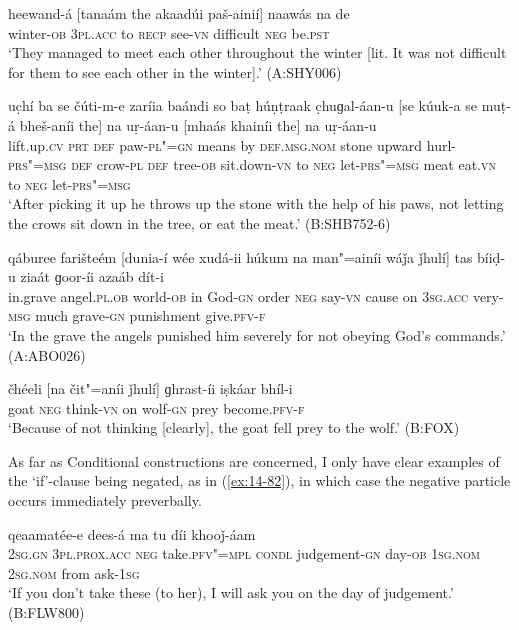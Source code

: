 \begin{exe}
\ex
\label{ex:14-78}
\gll heewand-á [tanaám the akaadúi paš-ainií] naawás  na de \\
winter-\textsc{ob} \textsc{3pl.acc} to \textsc{recp} see-\textsc{vn} difficult \textsc{neg}
be.\textsc{pst} \\
\glt `They managed to meet each other throughout the winter [lit. It was not difficult for them to see each other in the winter].' (A:SHY006)

\ex
\label{ex:14-79}
\gll uc̣hí ba se čúti-m-e zaríia baándi  so baṭ húṇṭraak c̣huɡal-áan-u  [se kúuk-a se muṭ-á bheš-aníi the] na uṛ-áan-u \textsc{[}mhaás khainíi the] na uṛ-áan-u \\
lift.up.\textsc{cv} \textsc{prt} \textsc{def} paw-\textsc{pl"=gn} means by  \textsc{def.msg.nom} stone upward hurl-\textsc{prs"=msg}  \textsc{def} crow-\textsc{pl} \textsc{def} tree-\textsc{ob} sit.down-\textsc{vn} to \textsc{neg} let-\textsc{prs"=msg} meat eat.\textsc{vn} to \textsc{neg} let-\textsc{prs"=msg} \\
\glt `After picking it up he throws up the stone with the help of his paws, not letting the crows sit down in the tree, or eat the meat.' (B:SHB752-6)

\ex
\label{ex:14-80}
\gll qáburee farišteém [dunia-í wée xudá-ii húkum na  man"=ainíi wáǰa
  ǰhulí] tas bíiḍ-u ziaát  ɡoor-íi azaáb dít-i \\
in.grave angel.\textsc{pl.ob} world-\textsc{ob} in God-\textsc{gn} order \textsc{neg}  say-\textsc{vn} cause on \textsc{3sg.acc} very-\textsc{msg} much grave-\textsc{gn} punishment give.\textsc{pfv-f}  \\
\glt `In the grave the angels punished him severely for not obeying God's commands.' (A:ABO026)

\ex
\label{ex:14-81}
\gll čhéeli [na čit"=aníi ǰhulí] ɡhrast-íi iṣkáar bhíl-i \\
goat \textsc{neg} think-\textsc{vn} on wolf-\textsc{gn} prey become.\textsc{pfv-f} \\
\glt `Because of not thinking [clearly], the goat fell prey to the wolf.' (B:FOX)
\end{exe}

As far as Conditional constructions are concerned, I only have clear examples of the `if'-clause being negated, as in (\ref{ex:14-82}), in which case the negative particle occurs immediately preverbally.

\begin{exe}
\ex
\label{ex:14-82}
  qeaamatée-e dees-á ma tu díi khooǰ-áam \\
\textsc{2sg.gn} \textsc{3pl.prox.acc} \textsc{neg} take.\textsc{pfv"=mpl} \textsc{condl}  judgement-\textsc{gn} day-\textsc{ob} \textsc{1sg.nom} \textsc{2sg.nom} from ask-\textsc{1sg}  \\
\glt `If you don't take these (to her), I will ask you on the day of judgement.' (B:FLW800)
\end{exe}

